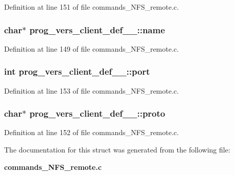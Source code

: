 Definition at line 151 of file commands\_\-NFS\_\-remote.c.
\subsubsection[{name}]{\setlength{\rightskip}{0pt plus 5cm}char$\ast$ {\bf prog\_\-vers\_\-client\_\-def\_\-\_\-::name}}\label{structprog__vers__client__def_____aa50aee1a2d3050045bcb931eb62c1929}


Definition at line 149 of file commands\_\-NFS\_\-remote.c.
\subsubsection[{port}]{\setlength{\rightskip}{0pt plus 5cm}int {\bf prog\_\-vers\_\-client\_\-def\_\-\_\-::port}}\label{structprog__vers__client__def_____ab0af7d0082b3e2f63559f77a473b0aa7}


Definition at line 153 of file commands\_\-NFS\_\-remote.c.
\subsubsection[{proto}]{\setlength{\rightskip}{0pt plus 5cm}char$\ast$ {\bf prog\_\-vers\_\-client\_\-def\_\-\_\-::proto}}\label{structprog__vers__client__def_____a051a5345c6bd0852ca5664c689bf9cd1}


Definition at line 152 of file commands\_\-NFS\_\-remote.c.

The documentation for this struct was generated from the following file:\begin{DoxyCompactItemize}
\item 
{\bf commands\_\-NFS\_\-remote.c}\end{DoxyCompactItemize}
